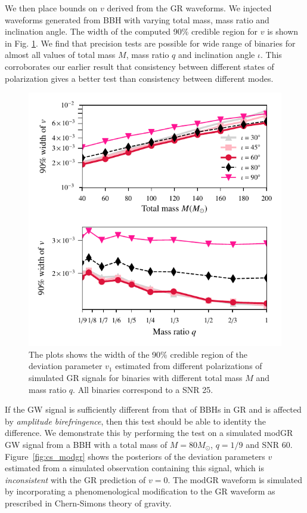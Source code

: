 \documentclass[prd,preprintnumbers,twocolumn,eqsecnum,floatfix,a4paper,nofootinbib,superscriptaddress]{revtex4}
\begin{document}
We then place bounds on $v$ derived from the GR waveforms. We injected waveforms generated from BBH with varying total mass, mass ratio and inclination angle. The width of the computed 90\% credible region for $v$ is shown in Fig. \ref{fig:cs_bounds}. We find that precision tests are possible for wide range of binaries for almost all values of total mass $M$, mass ratio $q$ and inclination angle $\iota$. This corroborates our earlier result that consistency between different states of polarization gives a better test than consistency between different modes. 

\begin{figure}[htb]
	\begin{center}
		\includegraphics[scale=0.8]{figs/v1_confidence_interval_pol.pdf} 
	\end{center} 
	\caption{The plots shows the width of the 90\% credible region of the deviation parameter $v_1$ estimated from different polarizations of simulated GR signals for binaries with different total mass $M$ and mass ratio $q$. All binaries correspond to a SNR 25.}
	\label{fig:cs_bounds}
\end{figure}

If the GW signal is sufficiently different from that of BBHs in GR and is affected by \textit{amplitude birefringence}, then this test should be able to identity the difference. We demonstrate this by performing the test on a simulated modGR GW signal from a BBH with a total mass of $M = 80 M_\odot$, $q=1/9$ and SNR 60. Figure~\ref{fig:cs_modgr} shows the posteriors of the deviation parameters $v$ estimated from a simulated observation containing this signal, which is \emph{inconsistent} with the GR prediction of $v=0$. The modGR waveform is simulated by incorporating a phenomenological modification to the GR waveform as prescribed in Chern-Simons theory of gravity. 
\end{document}
